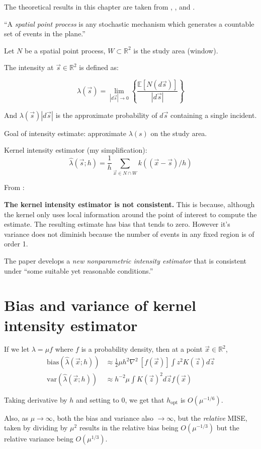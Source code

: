 


The theoretical results in this chapter are taken from \citet{diggle1988equivalence}, \citet{guan2008consistent}, and \citet{wand1994kernel}.

\begin{defn}
``A \textit{spatial point process} is any stochastic mechanism which generates a countable set of events in the plane.''
\end{defn}

Let \(N\) be a spatial point process, \(W \subset \mathbb{R}^2 \) is the study area (window).

The intensity at \(\vec{s} \in \mathbb{R}^2\) is defined as:

\[
    \lambda (\vec{s}) = \lim_{|d\vec{s}| \to 0} \left\{ \frac{\mathbb{E}[N(d\vec{s})]}{|d\vec{s}|} \right\}
\]

And \(\lambda(\vec{s})|d\vec{s}|\) is the approximate probability of \(d\vec{s}\) containing a single incident.

Goal of intensity estimate: approximate \(\lambda(s)\) on the study area.

Kernel intensity estimator (my simplification):
\[
    \hat{\lambda}(\vec{s}; h) = \frac{1}{h} \sum_{\vec{x} \in N \cap W}{k((\vec{x}-\vec{s})/h)}
\]

From \citet{guan2008consistent}:

{
\color{red}
\textbf{The kernel intensity estimator is not consistent.}
This is because, although the kernel only uses local information around the point of interest to compute the estimate.
The resulting estimate has bias that tends to zero.
However it's variance does not diminish because the number of events in any fixed region is of order 1.
}

The paper develops a \textit{new nonparametric intensity estimator} that is consistent under ``some suitable yet reasonable conditions.''

\section{Bias and variance of kernel intensity estimator}

If we let \(\lambda = \mu f\) where \(f\) is a probability density, then at a point \(\vec{x} \in \mathbb{R}^2\),
\begin{align}
\mbox{bias}(\hat{\lambda}(\vec{x};h)) & \approx \frac{1}{2} \mu h^2 \nabla^2~\left[ f(\vec{x}) \right] \int {z^2 K(\vec{z}) d\vec{z}} \\
\mbox{var}(\hat{\lambda}(\vec{x};h)) & \approx h^{-2} \mu \int {K(\vec{z})^2d\vec{z}} f(\vec{x})
\end{align}

Taking derivative by \(h\) and setting to \(0\), we get that \(h_{\mbox{opt}}\) is \(O(\mu^{-1/6})\).

Also, as \(\mu \to \infty\), both the bias and variance also \(\to \infty\),
but the \textit{relative} MISE, taken by dividing by \(\mu^2\) results in the relative bias being \(O(\mu^{-1/3})\)
but the relative variance being \(O(\mu^{1/3})\).



